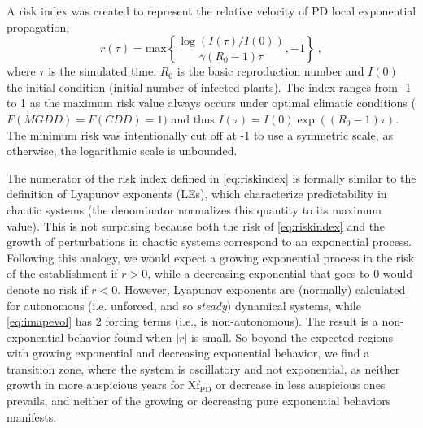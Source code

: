 A risk index was created to represent the relative velocity of PD local
exponential propagation,
\begin{equation}
    r(\tau)=\textrm{max}\left\{
    \frac{\log(I(\tau)/I(0))}{\gamma(R_0-1)\tau}, -1
    \right\} \ ,
    \label{eq:riskindex}
\end{equation}
where $\tau$ is the simulated time, $R_0$ is the basic reproduction number
and $I(0)$ the initial condition (initial number of infected plants). The index
ranges from -1 to 1 as the maximum risk value always occurs under optimal
climatic conditions ($F(MGDD)=F(CDD)=1)$ and thus
$I(\tau)=I(0)\exp((R_0-1)\tau)$. The minimum risk was intentionally cut off at
-1 to use a symmetric scale, as otherwise, the logarithmic scale is unbounded.

The numerator of the risk index defined in \cref{eq:riskindex} is formally
similar to the definition of Lyapunov exponents (LEs), which characterize
predictability in chaotic systems (the denominator normalizes this quantity to
its maximum value). This is not surprising because both the risk of
\cref{eq:riskindex} and the growth of perturbations in chaotic systems
correspond to an exponential process.
Following this analogy, we would expect a growing exponential process in
the risk of the establishment if $r>0$, while a decreasing exponential that
goes to $0$ would denote no risk if $r<0$.
However, Lyapunov exponents are (normally) calculated for autonomous (i.e.
unforced, and so \textit{steady}) dynamical systems, while \cref{eq:imapevol}
has $2$ forcing terms (i.e., is non-autonomous).
The result is a non-exponential behavior found when $|r|$ is small. So
beyond the expected regions with growing exponential and decreasing exponential
behavior, we find a transition zone, where the system is oscillatory and not
exponential, as neither growth in more auspicious years for Xf$_{\textrm{PD}}$
or decrease in less auspicious ones prevails, and neither of the growing or
decreasing pure exponential behaviors manifests.

